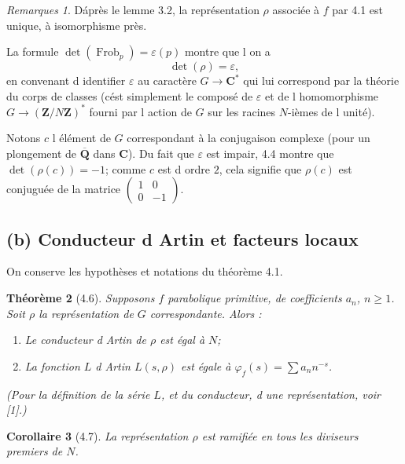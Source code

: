 \documentclass[11pt]{amsart}
\theoremstyle{plain}
\newtheorem{theoreme}{Théorème}[section]
\newtheorem{corollaire}[theoreme]{Corollaire}
\theoremstyle{definition}
\theoremstyle{remark}
\newtheorem{remarques}[theoreme]{Remarques}
\DeclareMathOperator{\frob}{Frob}
\newcommand{\Q}{\mathbf{Q}}
\newcommand{\Z}{\mathbf{Z}}
\newcommand{\C}{\mathbf{C}}
\begin{document}
\begin{remarques}
\item[4.3.] D\'apr\`es le lemme 3.2, la repr\'esentation $\rho$ associ\'ee \`a $f$ par 4.1 est unique, \`a isomorphisme pr\`es.
\item[4.4.] La formule $\det(\frob_p) = \varepsilon(p)$ montre que l on a
$$\det(\rho) = \varepsilon,$$
en convenant d identifier $\varepsilon$ au caract\`ere $G \to \C^*$ qui lui correspond par la th\'eorie du corps de classes (c\'est simplement le compos\'e de $\varepsilon$ et de l homomorphisme $G \to (\Z/N\Z)^*$ fourni par l action de $G$ sur les racines $N$-i\`emes de l unit\'e).
\item[4.5.] Notons $c$ l \'el\'ement de $G$ correspondant \`a la conjugaison complexe (pour un plongement de $\overline{\Q}$ dans $\C$). Du fait que $\varepsilon$ est impair, 4.4 montre que $\det(\rho(c)) = -1$; comme $c$ est d ordre $2$, cela signifie que $\rho(c)$ est conjugu\'ee de la matrice $\begin{pmatrix} 1 & 0 \\ 0 & -1 \end{pmatrix}$.
\end{remarques}

\subsection*{(b) Conducteur d Artin et facteurs locaux}

On conserve les hypoth\`eses et notations du th\'eor\`eme 4.1.

\begin{theoreme}[4.6]
Supposons $f$ parabolique primitive, de coefficients $a_n$, $n \ge 1$. Soit $\rho$ la repr\'esentation de $G$ correspondante. Alors :
\begin{enumerate}
\item[a.] Le conducteur d Artin de $\rho$ est \'egal \`a $N$;
\item[b.] La fonction $L$ d Artin $L(s, \rho)$ est \'egale \`a $\varphi_f(s) = \sum a_n n^{-s}$.
\end{enumerate}
(Pour la d\'efinition de la s\'erie $L$, et du conducteur, d une repr\'esentation, voir [1].)
\end{theoreme}

\begin{corollaire}[4.7]
La repr\'esentation $\rho$ est ramifi\'ee en tous les diviseurs premiers de $N$.
\end{corollaire}
\end{document}
